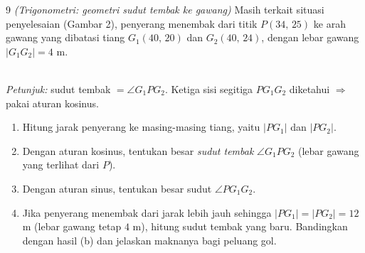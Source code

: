 \documentclass[11pt]{article}
\newenvironment{subsoal}{%
  \begin{enumerate}[label=\textbf{(\alph*)},leftmargin=1.8em,itemsep=5pt,topsep=3pt]}%
  {\end{enumerate}}
\begin{document}
\begin{soal}{9 \normalfont\itshape(Trigonometri: geometri sudut tembak ke gawang)}
Masih terkait situasi penyelesaian (Gambar 2), penyerang menembak dari titik
$P(34,\,25)$ ke arah gawang yang dibatasi tiang $G_1(40,\,20)$ dan
$G_2(40,\,24)$, dengan lebar gawang $|G_1G_2|=4$ m.

\begin{center}
\\[2pt]
{\small\textit{Petunjuk:} sudut tembak $=\angle G_1PG_2$. Ketiga sisi segitiga $PG_1G_2$ diketahui $\Rightarrow$ pakai aturan kosinus.}
\end{center}

\begin{subsoal}
  \item Hitung jarak penyerang ke masing-masing tiang, yaitu $|PG_1|$ dan $|PG_2|$.
  \item Dengan aturan kosinus, tentukan besar \emph{sudut tembak} $\angle G_1PG_2$
        (lebar gawang yang terlihat dari $P$).
  \item Dengan aturan sinus, tentukan besar sudut $\angle PG_1G_2$.
  \item Jika penyerang menembak dari jarak lebih jauh sehingga
        $|PG_1|=|PG_2|=12$ m (lebar gawang tetap $4$ m), hitung sudut tembak yang
        baru. Bandingkan dengan hasil (b) dan jelaskan maknanya bagi peluang gol.
\end{subsoal}
\end{soal}
\end{document}
